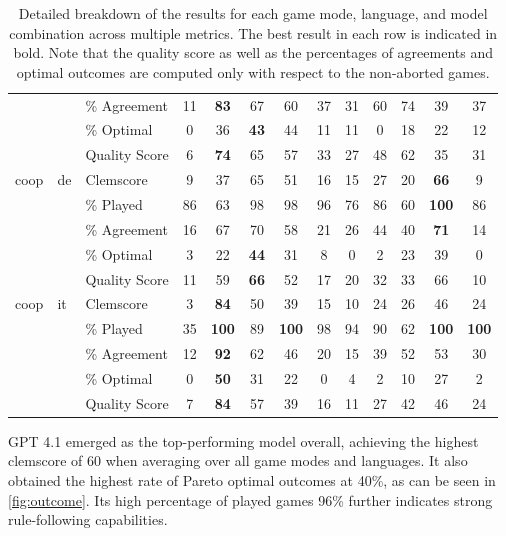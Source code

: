 \begin{table}[ht]
\begin{widepage}
\begin{tabular}{lllcccccccccc}
       &  & \% Agreement & 11 & \textbf{83} & 67 & 60 & 37 & 31 & 60 & 74 & 39 & 37 \\
       &  & \% Optimal & 0 & 36 & \textbf{43} & 44 & 11 & 11 & 0 & 18 & 22 & 12 \\
       &  & Quality Score & 6 & \textbf{74} & 65 & 57 & 33 & 27 & 48 & 62 & 35 & 31 \\
      \hline
      coop & de & Clemscore & 9 & 37 & 65 & 51 & 16 & 15 & 27 & 20 & \textbf{66} & 9 \\
       &  & \% Played & 86 & 63 & 98 & 98 & 96 & 76 & 86 & 60 & \textbf{100} & 86 \\
       &  & \% Agreement & 16 & 67 & 70 & 58 & 21 & 26 & 44 & 40 & \textbf{71} & 14 \\
       &  & \% Optimal & 3 & 22 & \textbf{44} & 31 & 8 & 0 & 2 & 23 & 39 & 0 \\
       &  & Quality Score & 11 & 59 & \textbf{66} & 52 & 17 & 20 & 32 & 33 & 66 & 10 \\
      \hline
      coop & it & Clemscore & 3 & \textbf{84} & 50 & 39 & 15 & 10 & 24 & 26 & 46 & 24 \\
       &  & \% Played & 35 & \textbf{100} & 89 & \textbf{100} & 98 & 94 & 90 & 62 & \textbf{100} & \textbf{100} \\
       &  & \% Agreement & 12 & \textbf{92} & 62 & 46 & 20 & 15 & 39 & 52 & 53 & 30 \\
       &  & \% Optimal & 0 & \textbf{50} & 31 & 22 & 0 & 4 & 2 & 10 & 27 & 2 \\
       &  & Quality Score & 7 & \textbf{84} & 57 & 39 & 16 & 11 & 27 & 42 & 46 & 24 \\
      \hline
    \end{tabular}
  \end{widepage}
  \caption{Detailed breakdown of the results for each game mode, language, and model combination across multiple metrics. The best result in each row is indicated in bold. Note that the quality score as well as the percentages of agreements and optimal outcomes are computed only with respect to the non-aborted games.}
  \label{tab:results}
\end{table}

GPT 4.1 emerged as the top-performing model overall, achieving the highest clemscore of 60 when averaging over all game modes and languages. It also obtained the highest rate of Pareto optimal outcomes at 40\%, as can be seen in \cref{fig:outcome}. Its high percentage of played games 96\% further indicates strong rule-following capabilities.

